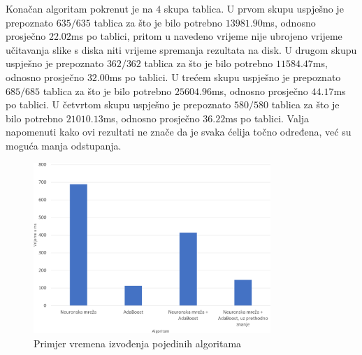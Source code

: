 \documentclass[times, utf8, zavrsni, numeric]{fer}
\begin{document}
Konačan algoritam pokrenut je na $4$ skupa tablica.
U prvom skupu uspješno je prepoznato $635/635$ tablica za što je bilo potrebno $13981.90$ms, odnosno prosječno $22.02$ms po tablici, pritom u navedeno vrijeme nije ubrojeno vrijeme učitavanja slike s diska niti vrijeme spremanja rezultata na disk.
U drugom skupu uspješno je prepoznato $362/362$ tablica za što je bilo potrebno $11584.47$ms, odnosno prosječno $32.00$ms po tablici.
U trećem skupu uspješno je prepoznato $685/685$ tablica za što je bilo potrebno $25604.96$ms, odnosno prosječno $44.17$ms po tablici.
U četvrtom skupu uspješno je prepoznato $580/580$ tablica za što je bilo potrebno $21010.13$ms, odnosno prosječno $36.22$ms po tablici.
Valja napomenuti kako ovi rezultati ne znače da je svaka ćelija točno određena, već su moguća manja odstupanja.\\

\begin{figure}[ht!]
    \centering
    \includegraphics[width=0.8\textwidth]{Images/TimeComparison}
    \captionsetup{justification=centering}
    \caption{Primjer vremena izvođenja pojedinih algoritama}
    \label{fig:compareTime}
\end{figure}
\end{document}
